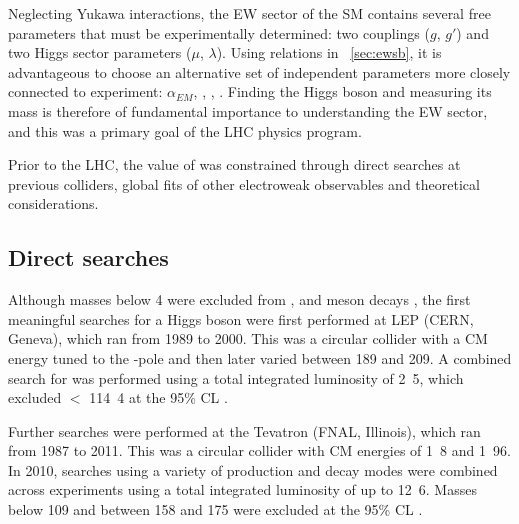 
Neglecting Yukawa interactions, the \ac{EW} sector of the \ac{SM} contains several free 
parameters that must be experimentally determined: two couplings ($g$, $g'$) and two 
Higgs sector parameters ($\mu$, $\lambda$). Using relations in \Section~\ref{sec:ewsb}, 
it is advantageous to choose an alternative set of independent parameters more closely 
connected to experiment: $\alpha_{EM}$, \mW, \mZ, \mH. Finding the Higgs boson and 
measuring its mass is therefore of fundamental importance to understanding the \ac{EW} 
sector, and this was a primary goal of the \ac{LHC} physics program.

Prior to the \ac{LHC}, the value of \mH was constrained through direct searches at 
previous colliders, global fits of other electroweak observables and theoretical 
considerations.



\subsection{Direct searches}
\label{sec:prior_constraints:direct}

Although masses below \unit{4}{\GeV} were excluded from \PB, \PUpsilon and \PK meson 
decays \cite{PDG:1988}, the first meaningful searches for a Higgs boson were first 
performed at \acs{LEP} (CERN, Geneva), which ran from 1989 to 2000. This was a circular 
\epluseminus collider with a \ac{CM} energy tuned to the \PZ-pole and then later varied 
between 189 and \unit{209}{\GeV}. A combined search for \ZH was performed using a total 
integrated luminosity of \unit{2.5}{\invfb}, which excluded \mH $<$ \unit{114.4}{\GeV} at 
the 95\% \ac{CL} \cite{LEP:2003}.

Further searches were performed at the Tevatron (FNAL, Illinois), which ran from 1987
to 2011. This was a circular \ppbar collider with \ac{CM} energies of \unit{1.8}{\TeV}
and \unit{1.96}{\TeV}. In 2010, searches using a variety of production and decay modes 
were combined across experiments using a total integrated luminosity of up to
\unit{12.6}{\invfb}. Masses below \unit{109}{\GeV} and between 158 and \unit{175}{\GeV} 
were excluded at the 95\% \ac{CL} \cite{Tevatron:2010}.




